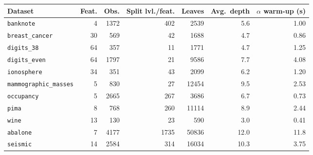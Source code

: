 \begin{tabular}{lrrrrrr}
\toprule
Dataset & Feat. & Obs. & Split lvl./feat. & Leaves & Avg.\ depth & $\alpha$ warm-up (s) \\
\midrule
\texttt{banknote} & 4 & 1372 & 402 & 2539 & 5.6 & 1.00 \\
\texttt{breast\_cancer} & 30 & 569 & 42 & 1688 & 4.7 & 0.86 \\
\texttt{digits\_38} & 64 & 357 & 11 & 1771 & 4.7 & 1.25 \\
\texttt{digits\_even} & 64 & 1797 & 21 & 9586 & 7.7 & 4.08 \\
\texttt{ionosphere} & 34 & 351 & 43 & 2099 & 6.2 & 1.20 \\
\texttt{mammographic\_masses} & 5 & 830 & 27 & 12454 & 9.5 & 2.53 \\
\texttt{occupancy} & 5 & 2665 & 267 & 3686 & 6.7 & 0.73 \\
\texttt{pima} & 8 & 768 & 260 & 11114 & 8.9 & 2.44 \\
\texttt{wine} & 13 & 130 & 23 & 590 & 3.0 & 0.41 \\
\texttt{abalone} & 7 & 4177 & 1735 & 50836 & 12.0 & 11.8 \\
\texttt{seismic} & 14 & 2584 & 314 & 16034 & 10.3 & 3.75 \\
\bottomrule
\end{tabular}

